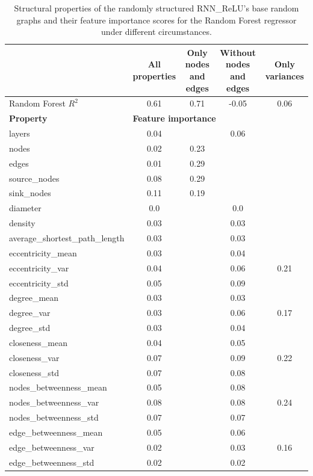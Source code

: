 \begin{table}[h]
	\centering
	\begin{tabular}{|l|c|c|c|c|}
	    \hline
		 & \shortstack{\textbf{All}\\\textbf{ properties}} & \shortstack{\textbf{Only nodes}\\\textbf{ and edges}} & \shortstack{\textbf{Without nodes}\\\textbf{ and edges}} & \shortstack{\textbf{Only}\\\textbf{ variances}}\\
		\hline
		Random Forest $R^{2}$ & 0.61 & 0.71 & -0.05 & 0.06\\
		\hline\hline
		\textbf{Property} & \multicolumn{4}{|l|}{\textbf{Feature importance}}\\
		\hline
		layers & 0.04 & & 0.06 & \\
        nodes & 0.02 & 0.23 & & \\
        edges & 0.01 & 0.29 & & \\
        source\_nodes & 0.08 & 0.29 & & \\
        sink\_nodes & 0.11 & 0.19 & & \\
        diameter & 0.0 & & 0.0 & \\
        density & 0.03 & & 0.03 & \\
        average\_shortest\_path\_length & 0.03 & & 0.03 & \\
        eccentricity\_mean & 0.03 & & 0.04 & \\
        eccentricity\_var & 0.04 & & 0.06 & 0.21 \\
        eccentricity\_std & 0.05 & & 0.09 & \\
        degree\_mean & 0.03 & & 0.03 & \\
        degree\_var & 0.03 & & 0.06 & 0.17 \\
        degree\_std & 0.03 & & 0.04 & \\
        closeness\_mean & 0.04 & & 0.05 & \\
        closeness\_var & 0.07 & & 0.09 & 0.22 \\
        closeness\_std & 0.07 & & 0.08 & \\
        nodes\_betweenness\_mean & 0.05 & & 0.08 & \\
        nodes\_betweenness\_var & 0.08 & & 0.08 & 0.24 \\
        nodes\_betweenness\_std & 0.07 & & 0.07 & \\
        edge\_betweenness\_mean & 0.05 & & 0.06 & \\
        edge\_betweenness\_var & 0.02 & & 0.03 & 0.16 \\
        edge\_betweenness\_std & 0.02 & & 0.02 & \\
		\hline
	\end{tabular}
	\caption[RNN\_ReLU - Feature importance scores for the Random Forest regressor under different circumstances]{Structural properties of the randomly structured RNN\_ReLU's base random graphs and their feature importance scores for the Random Forest regressor under different circumstances.}
	\label{tab:relu_fis}
\end{table}

